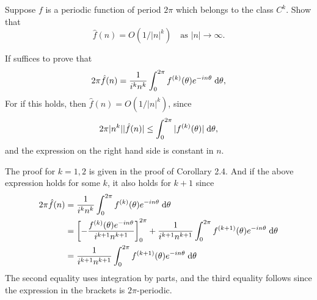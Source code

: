 \begin{exrc}[10]
    Suppose \(f\) is a periodic function of period \(2\pi\) which belongs to the class \(C^k\).
    Show that
    \begin{equation*}
        \hat{f}(n) = O(1 / |n|^k) \quad \text{as \(|n| \to \infty\)}.
    \end{equation*}

\begin{soln}
    If suffices to prove that
    \begin{equation*}
        2\pi\hat{f}(n) = \frac{1}{i^k n^k} \int_{0}^{2\pi} f^{(k)}(\theta)e^{-in\theta} \;\mathrm d \theta,
    \end{equation*}
    For if this holds, then
    \(\hat{f}(n) = O(1 / |n|^k)\),
    since
    \begin{equation*}
        2\pi |n^k| |\hat{f}(n)| \leq \int_{0}^{2\pi} |f^{(k)}(\theta)| \;\mathrm d \theta,
    \end{equation*}
    and the expression on the right hand side is constant in \(n\).

    The proof for \(k = 1, 2\) is given in the proof of Corollary 2.4.
    And if the above expression holds for some \(k\), it also holds for \(k + 1\) since
    \begin{align*}
        2\pi \hat{f}(n)
        &= \frac{1}{i^k n^k} \int_{0}^{2\pi} f^{(k)}(\theta) e^{-in\theta} \ud \theta \\
        &= \sqbr{- \frac{f^{(k)}(\theta) e^{-in\theta}}{i^{k + 1} n^{k + 1}}}_{0}^{2\pi}
        + \frac{1}{i^{k + 1} n^{k + 1}} \int_{0}^{2\pi} f^{(k + 1)}(\theta) e^{-in\theta} \ud \theta \\
        &= \frac{1}{i^{k + 1} n^{k + 1}} \int_{0}^{2\pi} f^{(k + 1)}(\theta) e^{-in\theta} \ud \theta
    \end{align*}
    The second equality uses integration by parts,
    and the third equality follows since the expression in the brackets is \(2\pi\)-periodic.


\end{soln}
\end{exrc}
